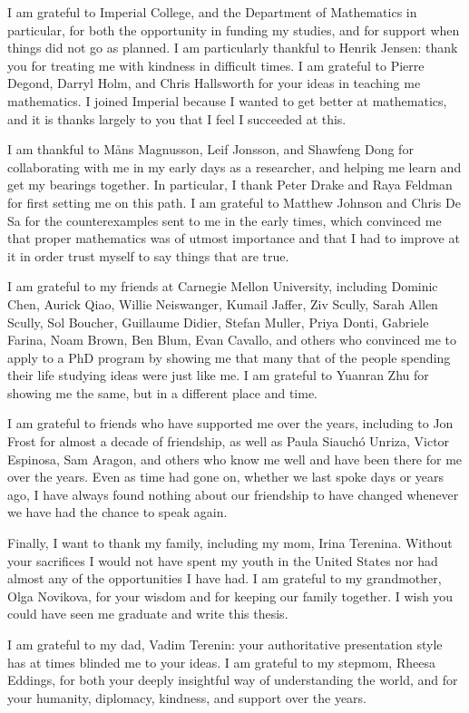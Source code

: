 \documentclass[11pt]{book}
\begin{document}
I am grateful to Imperial College, and the Department of Mathematics in particular, for both the opportunity in funding my studies, and for support when things did not go as planned.
I am particularly thankful to Henrik Jensen: thank you for treating me with kindness in difficult times.
I am grateful to Pierre Degond, Darryl Holm, and Chris Hallsworth for your ideas in teaching me mathematics. I joined Imperial because I wanted to get better at mathematics, and it is thanks largely to you that I feel I succeeded at this.

I am thankful to Måns Magnusson, Leif Jonsson, and Shawfeng Dong for collaborating with me in my early days as a researcher, and helping me learn and get my bearings together.
In particular, I thank Peter Drake and Raya Feldman for first setting me on this path.
I am grateful to Matthew Johnson and Chris De Sa for the counterexamples sent to me in the early times, which convinced me that proper mathematics was of utmost importance and that I had to improve at it in order trust myself to say things that are true.

I am grateful to my friends at Carnegie Mellon University, including Dominic Chen, Aurick Qiao, Willie Neiswanger, Kumail Jaffer, Ziv Scully, Sarah Allen Scully, Sol Boucher, Guillaume Didier, Stefan Muller, Priya Donti, Gabriele Farina, Noam Brown, Ben Blum, Evan Cavallo, and others who convinced me to apply to a PhD program by showing me that many that of the people spending their life studying ideas were just like me.
I am grateful to Yuanran Zhu for showing me the same, but in a different place and time.

I am grateful to friends who have supported me over the years, including to Jon Frost for almost a decade of friendship, as well as Paula Siauchó Unriza, Victor Espinosa, Sam Aragon, and others who know me well and have been there for me over the years.
Even as time had gone on, whether we last spoke days or years ago, I have always found nothing about our friendship to have changed whenever we have had the chance to speak again.

Finally, I want to thank my family, including my mom, Irina Terenina. 
Without your sacrifices I would not have spent my youth in the United States nor had almost any of the opportunities I have had. 
I am grateful to my grandmother, Olga Novikova, for your wisdom and for keeping our family together.
I wish you could have seen me graduate and write this thesis.

I am grateful to my dad, Vadim Terenin: your authoritative presentation style has at times blinded me to your ideas. 
I am grateful to my stepmom, Rheesa Eddings, for both your deeply insightful way of understanding the world, and for your humanity, diplomacy, kindness, and support over the years.
\end{document}
